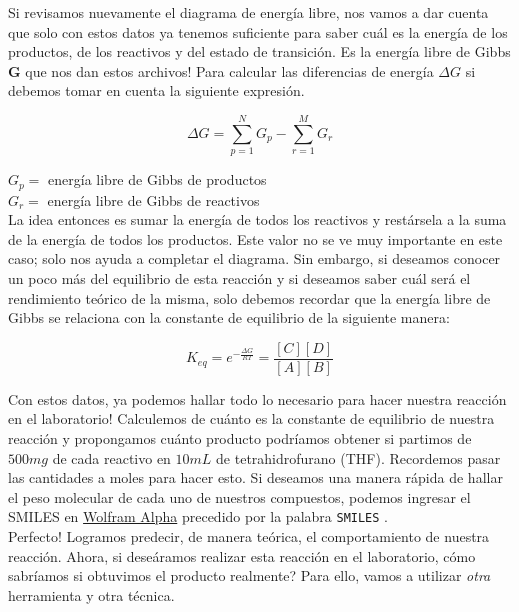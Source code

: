 \documentclass[10pt,letterpaper]{article}
\newcommand{\inlinecode}[1]{
\colorbox{light-gray}{\texttt{#1}}
}
\begin{document}
Si revisamos nuevamente el diagrama de energ\'ia libre, nos vamos a dar cuenta que solo con estos datos ya tenemos suficiente para saber cu\'al es la energ\'ia de los productos, de los reactivos y del estado de transici\'on. Es la energ\'ia libre de Gibbs \textbf{G} que nos dan estos archivos! Para calcular las diferencias de energ\'ia $\Delta G$ si debemos tomar en cuenta la siguiente expresi\'on.

\begin{equation}
\Delta G = \sum^{N}_{p=1} G_{p} - \sum^{M}_{r=1} G_{r}
\end{equation}

\noindent $G_{p} =$ energ\'ia libre de Gibbs de productos\\
$G_{r} =$ energ\'ia libre de Gibbs de reactivos\\

La idea entonces es sumar la energ\'ia de todos los reactivos y rest\'arsela a la suma de la energ\'ia de todos los productos. Este valor no se ve muy importante en este caso; solo nos ayuda a completar el diagrama. Sin embargo, si deseamos conocer un poco m\'as del equilibrio de esta reacci\'on y si deseamos saber cu\'al ser\'a el rendimiento te\'orico de la misma, solo debemos recordar que la energ\'ia libre de Gibbs se relaciona con la constante de equilibrio de la siguiente manera:

\begin{equation}
K_{eq} = e^{- \frac{\Delta G}{R T} } = \frac{ \left[ C \right] \left[ D \right] }{ \left[ A \right] \left[ B \right] }
\end{equation}

Con estos datos, ya podemos hallar todo lo necesario para hacer nuestra reacci\'on en el laboratorio! Calculemos de cu\'anto es la constante de equilibrio de nuestra reacci\'on y propongamos cu\'anto producto podr\'iamos obtener si partimos de $500mg$ de cada reactivo en $10mL$ de tetrahidrofurano (THF). Recordemos pasar las cantidades a moles para hacer esto. Si deseamos una manera r\'apida de hallar el peso molecular de cada uno de nuestros compuestos, podemos ingresar el SMILES en \href{https://www.wolframalpha.com/}{Wolfram Alpha} precedido por la palabra \inlinecode{SMILES}.\\

Perfecto! Logramos predecir, de manera te\'orica, el comportamiento de nuestra reacci\'on. Ahora, si dese\'aramos realizar esta reacci\'on en el laboratorio, c\'omo sabr\'iamos si obtuvimos el producto realmente? Para ello, vamos a utilizar \textit{otra} herramienta y otra t\'ecnica.
\end{document}
